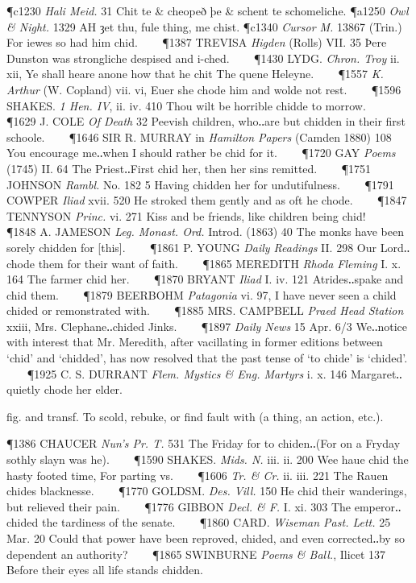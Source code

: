 \begin{description}[wide, labelwidth=!, labelindent=0pt]
\begin{myenumerate}
\P c1230 \textit{Hali  Meid.} 31 Chit te \& cheopeð þe \& schent te schomeliche.
\P a1250 \textit{Owl \& Night.} 1329 AH ȝet  thu, fule thing, me chist.
\P c1340  \textit{Cursor M.} 13867 (Trin.) For iewes so had him chid.    
\P 1387 TREVISA  \textit{Higden} (Rolls) VII. 35 Þere Dunston was strongliche despised and i-ched.    
\P 1430 LYDG.  \textit{Chron. Troy} ii. xii, Ye shall heare anone how that he chit The quene Heleyne.    
\P 1557 \textit{K. Arthur}  (W. Copland) vii. vi, Euer she chode him and wolde not rest.    
\P 1596 SHAKES.  \textit{1 Hen. IV}, ii. iv. 410 Thou wilt be horrible chidde to morrow.    
\P 1629 J. COLE  \textit{Of Death} 32 Peevish children, who‥are but chidden in their first schoole.    
\P 1646 SIR R. MURRAY  in \textit{Hamilton Papers} (Camden 1880) 108 You encourage me‥when I should rather be chid for it.    
\P 1720 GAY  \textit{Poems} (1745) II. 64 The Priest‥First chid her, then her sins remitted.    
\P 1751 JOHNSON  \textit{Rambl.} No. 182 5 Having chidden her for undutifulness.    
\P 1791 COWPER  \textit{Iliad} xvii. 520 He stroked them gently and as oft he chode.    
\P 1847 TENNYSON  \textit{Princ.} vi. 271 Kiss and be friends, like children being chid!    
\P 1848 A. JAMESON  \textit{Leg. Monast. Ord.} Introd. (1863) 40 The monks have been sorely chidden for [this].    
\P 1861 P. YOUNG  \textit{Daily Readings} II. 298 Our Lord‥chode them for their want of faith.    
\P 1865 MEREDITH  \textit{Rhoda Fleming} I. x. 164 The farmer chid her.    
\P 1870 BRYANT  \textit{Iliad} I. iv. 121 Atrides‥spake and chid them.    
\P 1879 BEERBOHM  \textit{Patagonia} vi. 97, I have never seen a child chided or remonstrated with.    
\P 1885 MRS. CAMPBELL  \textit{Praed Head Station} xxiii, Mrs. Clephane‥chided Jinks.    
\P 1897  \textit{Daily News} 15 Apr. 6/3 We‥notice with interest that Mr. Meredith, after vacillating in former editions between ‘chid’ and ‘chidded’, has now resolved that the past tense of ‘to chide’ is ‘chided’.    
\P 1925 C. S. DURRANT  \textit{Flem. Mystics \& Eng. Martyrs} i. x. 146 Margaret‥quietly chode her elder.

 fig. and transf. To scold, rebuke, or find fault with (a thing, an action, etc.).

\P 1386 CHAUCER  \textit{Nun's Pr. T.} 531 The Friday for to chiden‥(For on a Fryday sothly slayn was he).    
\P 1590 SHAKES.  \textit{Mids. N.} iii. ii. 200 Wee haue chid the hasty footed time, For parting vs.    
\P 1606 \textit{Tr. \& Cr.} ii. iii. 221 The Rauen chides blacknesse.    
\P 1770 GOLDSM.  \textit{Des. Vill.} 150 He chid their wanderings, but relieved their pain.    
\P 1776 GIBBON  \textit{Decl. \& F.} I. xi. 303 The emperor‥chided the tardiness of the senate.    
\P 1860 CARD.  \textit{Wiseman Past. Lett.} 25 Mar. 20 Could that power have been reproved, chided, and even corrected‥by so dependent an authority?    
\P 1865 SWINBURNE  \textit{Poems \& Ball.}, Ilicet 137 Before their eyes all life stands chidden.


\end{myenumerate}
\end{description}
